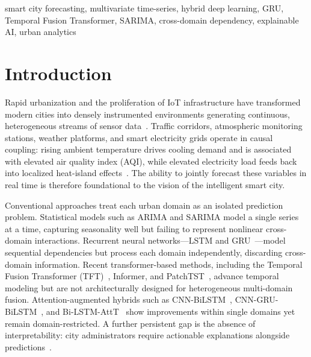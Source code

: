 \documentclass[conference]{IEEEtran}
\begin{document}
\begin{IEEEkeywords}
smart city forecasting, multivariate time-series, hybrid deep learning, GRU, Temporal Fusion Transformer, SARIMA, cross-domain dependency, explainable AI, urban analytics
\end{IEEEkeywords}

\section{Introduction}
Rapid urbanization and the proliferation of IoT infrastructure have transformed modern cities into densely instrumented environments generating continuous, heterogeneous streams of sensor data~\cite{ref1}. Traffic corridors, atmospheric monitoring stations, weather platforms, and smart electricity grids operate in causal coupling: rising ambient temperature drives cooling demand and is associated with elevated air quality index (AQI), while elevated electricity load feeds back into localized heat-island effects~\cite{ref2}. The ability to jointly forecast these variables in real time is therefore foundational to the vision of the intelligent smart city.

Conventional approaches treat each urban domain as an isolated prediction problem. Statistical models such as ARIMA and SARIMA model a single series at a time, capturing seasonality well but failing to represent nonlinear cross-domain interactions. Recurrent neural networks---LSTM and GRU~\cite{ref3}---model sequential dependencies but process each domain independently, discarding cross-domain information. Recent transformer-based methods, including the Temporal Fusion Transformer (TFT)~\cite{ref4,ref5}, Informer, and PatchTST~\cite{ref6}, advance temporal modeling but are not architecturally designed for heterogeneous multi-domain fusion. Attention-augmented hybrids such as CNN-BiLSTM~\cite{ref7}, CNN-GRU-BiLSTM~\cite{ref8}, and Bi-LSTM-AttT~\cite{ref9} show improvements within single domains yet remain domain-restricted. A further persistent gap is the absence of interpretability: city administrators require actionable explanations alongside predictions~\cite{ref2,ref10,ref11}.
\end{document}
